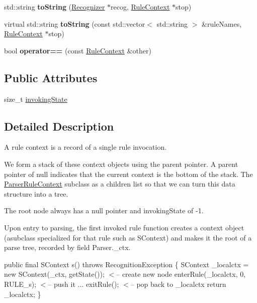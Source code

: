\begin{DoxyCompactItemize}
std\+::string {\bfseries to\+String} (\hyperlink{classantlr4_1_1Recognizer}{Recognizer} $\ast$recog, \hyperlink{classantlr4_1_1RuleContext}{Rule\+Context} $\ast$stop)
\item 
\mbox{\label{classantlr4_1_1RuleContext_ac62fa052c96061993df78332adac0430}} 
virtual std\+::string {\bfseries to\+String} (const std\+::vector$<$ std\+::string $>$ \&rule\+Names, \hyperlink{classantlr4_1_1RuleContext}{Rule\+Context} $\ast$stop)
\item 
\mbox{\label{classantlr4_1_1RuleContext_a78d3283be6274bee157fd0a5f5e90001}} 
bool {\bfseries operator==} (const \hyperlink{classantlr4_1_1RuleContext}{Rule\+Context} \&other)
\end{DoxyCompactItemize}
\subsection*{Public Attributes}
\begin{DoxyCompactItemize}
\item 
size\+\_\+t \hyperlink{classantlr4_1_1RuleContext_a2c4b8b84636c681f98dcd86d5c5a8459}{invoking\+State}
\end{DoxyCompactItemize}


\subsection{Detailed Description}
A rule context is a record of a single rule invocation.

We form a stack of these context objects using the parent pointer. A parent pointer of null indicates that the current context is the bottom of the stack. The \hyperlink{classantlr4_1_1ParserRuleContext}{Parser\+Rule\+Context} subclass as a children list so that we can turn this data structure into a tree.

The root node always has a null pointer and invoking\+State of -\/1.

Upon entry to parsing, the first invoked rule function creates a context object (asubclass specialized for that rule such as S\+Context) and makes it the root of a parse tree, recorded by field Parser.\+\_\+ctx.

public final S\+Context s() throws Recognition\+Exception \{ S\+Context \+\_\+localctx = new S\+Context(\+\_\+ctx, get\+State()); $<$-- create new node enter\+Rule(\+\_\+localctx, 0, R\+U\+L\+E\+\_\+s); $<$-- push it ... exit\+Rule(); $<$-- pop back to \+\_\+localctx return \+\_\+localctx; \}

